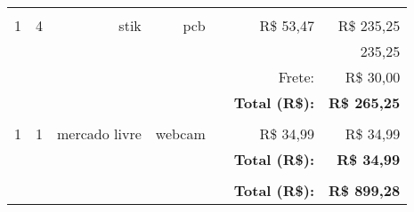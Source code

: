 \begin{table}[!h]
\begin{tabular}{crrrrrr}
          &       & \multicolumn{1}{c}{} & \multicolumn{1}{l}{} & \multicolumn{1}{l}{} &       &  \\
    1     & 4     & stik  & pcb   & \multicolumn{1}{l}{} & R\$ 53,47 & R\$ 235,25 \\
          &       & \multicolumn{1}{c}{} & \multicolumn{1}{l}{} & \multicolumn{1}{l}{} &       & 235,25 \\
          &       & \multicolumn{1}{c}{} & \multicolumn{1}{l}{} & \multicolumn{1}{l}{} & Frete: & R\$ 30,00 \\
          &       & \multicolumn{1}{c}{} & \multicolumn{1}{l}{} & \multicolumn{1}{l}{} & \textbf{Total (R\$):} & \textbf{R\$ 265,25} \\
          &       & \multicolumn{1}{c}{} & \multicolumn{1}{l}{} & \multicolumn{1}{l}{} &       &  \\
    1     & 1     & mercado livre & webcam & \multicolumn{1}{l}{} & R\$ 34,99 & R\$ 34,99 \\
          &       & \multicolumn{1}{c}{} & \multicolumn{1}{l}{} & \multicolumn{1}{l}{} & \textbf{Total (R\$):} & \textbf{R\$ 34,99} \\
          &       & \multicolumn{1}{c}{} & \multicolumn{1}{l}{} & \multicolumn{1}{l}{} &       &  \\
          &       & \multicolumn{1}{c}{} & \multicolumn{1}{l}{} & \multicolumn{1}{l}{} & \textbf{Total (R\$):} & \textbf{R\$ 899,28} \\
    \bottomrule
    \end{tabular}%
  \label{tab:custos}%
\end{table}%


